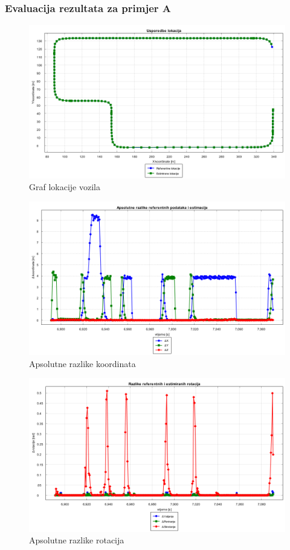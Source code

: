 \subsubsection{Evaluacija rezultata za primjer A}
\begin{figure}[H]
  \includegraphics[scale=0.4]{images/voxel/pr3/usporedba_lokacija.png}
  \caption{Graf lokacije vozila}
  \label{eval:a2p3_lokacija}
\end{figure}
\begin{figure}[H]
  \includegraphics[scale=0.4]{images/voxel/pr3/apsolutne_razlike_koordinata.png}
  \caption{Apsolutne razlike koordinata}
  \label{eval:a2p3_koord_razlike}
\end{figure}
\begin{figure}[H]
  \includegraphics[scale=0.4]{images/voxel/pr3/rotacije_razlike.png}
  \caption{Apsolutne razlike rotacija}
  \label{eval:a2p3_rot_razlike}
\end{figure}
